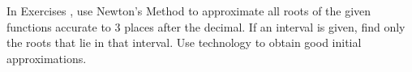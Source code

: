 {\noindent In Exercises}
{, use Newton's Method to approximate all roots of the given functions accurate to 3 places after the decimal. If an interval is given, find only the roots that lie in that interval. Use technology to obtain good initial approximations.
}
